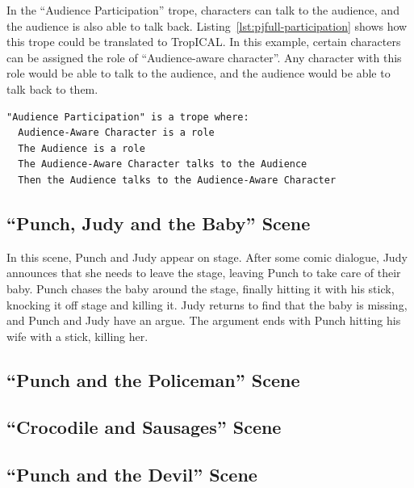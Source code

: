 \documentclass[11pt]{report}
\begin{document}
In the ``Audience Participation'' trope, characters can talk to the audience,
and the audience is also able to talk back.
Listing~\ref{lst:pjfull-participation} shows how this trope could be translated
to TropICAL. In this example, certain characters can be assigned the role of
``Audience-aware character''. Any character with this role would be able to talk
to the audience, and the audience would be able to talk back to them.

\begin{lstlisting}[label={lst:pjfull-participation}, caption={The ``Audience Participation'' trope}]
"Audience Participation" is a trope where:
  Audience-Aware Character is a role
  The Audience is a role
  The Audience-Aware Character talks to the Audience
  Then the Audience talks to the Audience-Aware Character
\end{lstlisting}

\subsection{``Punch, Judy and the Baby'' Scene}

In this scene, Punch and Judy appear on stage. After some comic dialogue, Judy
announces that she needs to leave the stage, leaving Punch to take care of their
baby. Punch chases the baby around the stage, finally hitting it with his stick,
knocking it off stage and killing it. Judy returns to find that the baby is
missing, and Punch and Judy have an argue. The argument ends with Punch hitting
his wife with a stick, killing her.

\subsection{``Punch and the Policeman'' Scene}

\subsection{``Crocodile and Sausages'' Scene}

\subsection{``Punch and the Devil'' Scene}
\end{document}
